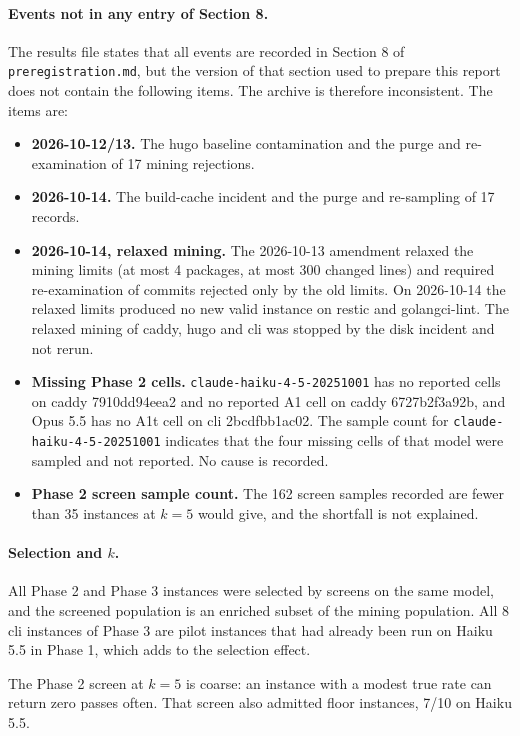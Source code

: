\documentclass[10pt]{article}
\begin{document}
\paragraph{Events not in any entry of Section 8.} The results file states that all events are recorded in Section 8 of \texttt{preregistration.md}, but the version of that section used to prepare this report does not contain the following items. The archive is therefore inconsistent. The items are:
\begin{itemize}
\item \textbf{2026-10-12/13.} The hugo baseline contamination and the purge and re-examination of 17 mining rejections.
\item \textbf{2026-10-14.} The build-cache incident and the purge and re-sampling of 17 records.
\item \textbf{2026-10-14, relaxed mining.} The 2026-10-13 amendment relaxed the mining limits (at most 4 packages, at most 300 changed lines) and required re-examination of commits rejected only by the old limits. On 2026-10-14 the relaxed limits produced no new valid instance on restic and golangci-lint. The relaxed mining of caddy, hugo and cli was stopped by the disk incident and not rerun.
\item \textbf{Missing Phase 2 cells.} \texttt{claude-haiku-4-5-20251001} has no reported cells on caddy 7910dd94eea2 and no reported A1 cell on caddy 6727b2f3a92b, and Opus 5.5 has no A1t cell on cli 2bcdfbb1ac02. The sample count for \texttt{claude-haiku-4-5-20251001} indicates that the four missing cells of that model were sampled and not reported. No cause is recorded.
\item \textbf{Phase 2 screen sample count.} The 162 screen samples recorded are fewer than 35 instances at $k=5$ would give, and the shortfall is not explained.
\end{itemize}

\paragraph{Selection and $k$.} All Phase 2 and Phase 3 instances were selected by screens on the same model, and the screened population is an enriched subset of the mining population. All 8 cli instances of Phase 3 are pilot instances that had already been run on Haiku 5.5 in Phase 1, which adds to the selection effect.

The Phase 2 screen at $k=5$ is coarse: an instance with a modest true rate can return zero passes often. That screen also admitted floor instances, 7/10 on Haiku 5.5.
\end{document}
